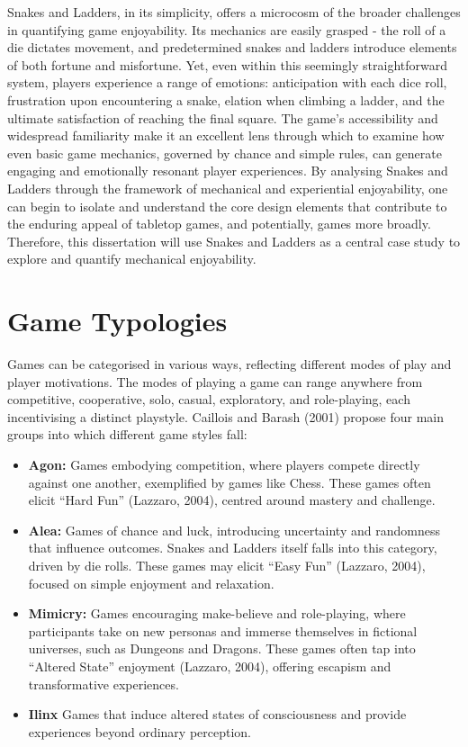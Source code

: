 Snakes and Ladders, in its simplicity, offers a microcosm of the broader challenges in quantifying game enjoyability. Its mechanics are easily grasped - the roll of a die dictates movement, and predetermined snakes and ladders introduce elements of both fortune and misfortune. Yet, even within this seemingly straightforward system, players experience a range of emotions: anticipation with each dice roll, frustration upon encountering a snake, elation when climbing a ladder, and the ultimate satisfaction of reaching the final square. The game's accessibility and widespread familiarity make it an excellent lens through which to examine how even basic game mechanics, governed by chance and simple rules, can generate engaging and emotionally resonant player experiences. By analysing Snakes and Ladders through the framework of mechanical and experiential enjoyability, one can begin to isolate and understand the core design elements that contribute to the enduring appeal of tabletop games, and potentially, games more broadly.  Therefore, this dissertation will use Snakes and Ladders as a central case study to explore and quantify mechanical enjoyability.

\section{Game Typologies}
Games can be categorised in various ways, reflecting different modes of play and player motivations. The modes of playing a game can range anywhere from competitive, cooperative, solo, casual, exploratory, and role-playing, each incentivising a distinct playstyle.  Caillois and Barash (2001) propose four main groups into which different game styles fall:
\begin{itemize}
	\item \textbf{Agon:} Games embodying competition, where players compete directly against one another, exemplified by games like Chess. These games often elicit “Hard Fun” (Lazzaro, 2004), centred around mastery and challenge.
	\item \textbf{Alea:} Games of chance and luck, introducing uncertainty and randomness that influence outcomes. Snakes and Ladders itself falls into this category, driven by die rolls. These games may elicit “Easy Fun” (Lazzaro, 2004), focused on simple enjoyment and relaxation.
	\item \textbf{Mimicry:} Games encouraging make-believe and role-playing, where participants take on new personas and immerse themselves in fictional universes, such as Dungeons and Dragons. These games often tap into “Altered State” enjoyment (Lazzaro, 2004), offering escapism and transformative experiences.
	\item \textbf{Ilinx} Games that induce altered states of consciousness and provide experiences beyond ordinary perception.
\end{itemize}

